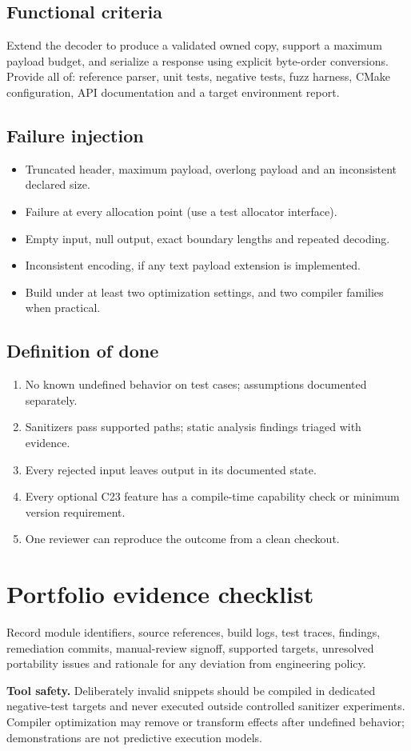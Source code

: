 \documentclass[10pt,letterpaper,oneside]{report}
\begin{document}
\section{Functional criteria}
Extend the decoder to produce a validated owned copy, support a maximum payload budget, and serialize a response using explicit byte-order conversions. Provide all of: reference parser, unit tests, negative tests, fuzz harness, CMake configuration, API documentation and a target environment report.
\section{Failure injection}
\begin{itemize}
\item Truncated header, maximum payload, overlong payload and an inconsistent declared size.
\item Failure at every allocation point (use a test allocator interface).
\item Empty input, null output, exact boundary lengths and repeated decoding.
\item Inconsistent encoding, if any text payload extension is implemented.
\item Build under at least two optimization settings, and two compiler families when practical.
\end{itemize}
\section{Definition of done}
\begin{enumerate}\item No known undefined behavior on test cases; assumptions documented separately.
\item Sanitizers pass supported paths; static analysis findings triaged with evidence.
\item Every rejected input leaves output in its documented state.
\item Every optional C23 feature has a compile-time capability check or minimum version requirement.
\item One reviewer can reproduce the outcome from a clean checkout.\end{enumerate}
\chapter{Portfolio evidence checklist}
Record module identifiers, source references, build logs, test traces, findings, remediation commits, manual-review signoff, supported targets, unresolved portability issues and rationale for any deviation from engineering policy.\par
\begin{warnbox}\textbf{Tool safety.} Deliberately invalid snippets should be compiled in dedicated negative-test targets and never executed outside controlled sanitizer experiments. Compiler optimization may remove or transform effects after undefined behavior; demonstrations are not predictive execution models.\end{warnbox}
\end{document}
